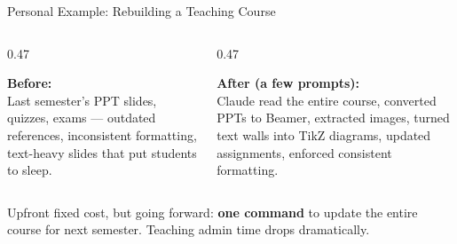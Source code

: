 \documentclass[aspectratio=169, 11pt]{beamer}
\newcommand{\emphgold}[1]{\alert{\textbf{#1}}}
\begin{document}
\begin{frame}{Personal Example: Rebuilding a Teaching Course}
\begin{columns}[T]
\begin{column}{0.47\textwidth}
  \begin{tcolorbox}[
    enhanced, colback=red!5, colframe=red!30, boxrule=0.5pt,
    sharp corners, left=8pt, right=8pt, top=5pt, bottom=5pt,
  ]
    {\small\bfseries\color{coral} Before:}\\[4pt]
    {\scriptsize Last semester's PPT slides, quizzes, exams --- outdated references, inconsistent formatting, text-heavy slides that put students to sleep.}
  \end{tcolorbox}
\end{column}
\begin{column}{0.47\textwidth}
  \begin{tcolorbox}[
    enhanced, colback=green!5, colframe=green!30!black, boxrule=0.5pt,
    sharp corners, left=8pt, right=8pt, top=5pt, bottom=5pt,
  ]
    {\small\bfseries\color{sage} After (a few prompts):}\\[4pt]
    {\scriptsize Claude read the entire course, converted PPTs to Beamer, extracted images, turned text walls into TikZ diagrams, updated assignments, enforced consistent formatting.}
  \end{tcolorbox}
\end{column}
\end{columns}

\vspace{0.1cm}
\begin{keyinsight}
  {\small Upfront fixed cost, but going forward: \emphgold{one command} to update the entire course for next semester. Teaching admin time drops dramatically.}
\end{keyinsight}
\end{frame}
\end{document}
